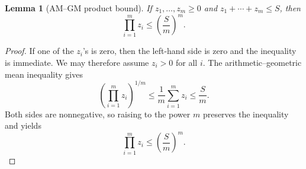 \documentclass[11pt,a4paper]{article}
\newtheorem{lemma}{Lemma}
\begin{document}
\begin{lemma}[AM--GM product bound]
If \(z_1,
\dots,z_m\ge0\) and \(z_1+\cdots+z_m\le S\), then
\[
  \prod_{i=1}^m z_i\le\left(\frac{S}{m}\right)^m.
\]
\end{lemma}

\begin{proof}
If one of the \(z_i\)'s is zero, then the left-hand side is zero and the
inequality is immediate.  We may therefore assume \(z_i>0\) for all \(i\).
The arithmetic--geometric mean inequality gives
\[
  \left(\prod_{i=1}^m z_i\right)^{1/m}
  \le
  \frac1m\sum_{i=1}^m z_i
  \le
  \frac{S}{m}.
\]
Both sides are nonnegative, so raising to the power \(m\) preserves the
inequality and yields
\[
  \prod_{i=1}^m z_i\le\left(\frac{S}{m}\right)^m .
\]
\end{proof}
\end{document}
